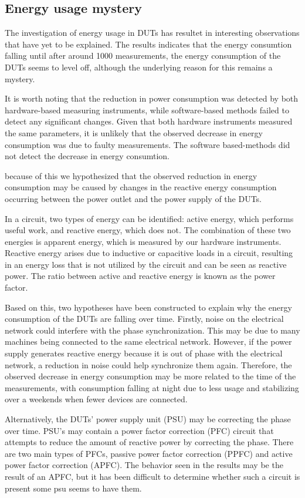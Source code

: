 \subsection{Energy usage mystery}
The investigation of energy usage in DUTs has resultet in interesting observations that have yet to be explained. The results indicates that the energy consumtion falling until after around 1000 measurements, the energy consumption of the DUTs seems to level off, although the underlying reason for this remains a mystery.

It is worth noting that the reduction in power consumption was detected by both hardware-based measuring instruments, while software-based methods failed to detect any significant changes. Given that both hardware instruments measured the same parameters, it is unlikely that the observed decrease in energy consumption was due to faulty measurements. The software based-methods did not detect the decrease in energy consumtion.

because of this we hypothesized that the observed reduction in energy consumption may be caused by changes in the reactive energy consumption occurring between the power outlet and the power supply of the DUTs.

In a circuit, two types of energy can be identified: active energy, which performs useful work, and reactive energy, which does not. The combination of these two energies is apparent energy, which is measured by our hardware instruments. Reactive energy arises due to inductive or capacitive loads in a circuit, resulting in an energy loss that is not utilized by the circuit and can be seen as reactive power\cite{ReactP}. The ratio between active and reactive energy is known as the power factor\cite{ReactP}.

Based on this, two hypotheses have been constructed to explain why the energy consumption of the DUTs are falling over time. Firstly, noise on the electrical network could interfere with the phase synchronization. This may be due to many machines being connected to the same electrical network. However, if the power supply generates reactive energy because it is out of phase with the electrical network, a reduction in noise could help synchronize them again. Therefore, the observed decrease in energy consumption may be more related to the time of the measurements, with consumption falling at night due to less usage and stabilizing over a weekends when fewer devices are connected.

Alternatively, the DUTs' power supply unit (PSU) may be correcting the phase over time. PSU's may contain a power factor correction (PFC) circuit that attempts to reduce the amount of reactive power by correcting the phase. There are two main types of PFCs, passive power factor correction (PPFC) and active power factor correction (APFC)\cite{mcdonald2020power}. The behavior seen in the results may be the result of an APFC, but it has been difficult to determine whether such a circuit is present some psu seems to have them\cite{TomPsuPFC}.

